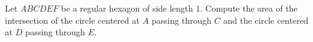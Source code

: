 Let $ABCDEF$ be a regular hexagon of side length $1$. Compute the area of the intersection of the circle centered at $A$ passing through $C$ and the circle centered at $D$ passing through $E$.